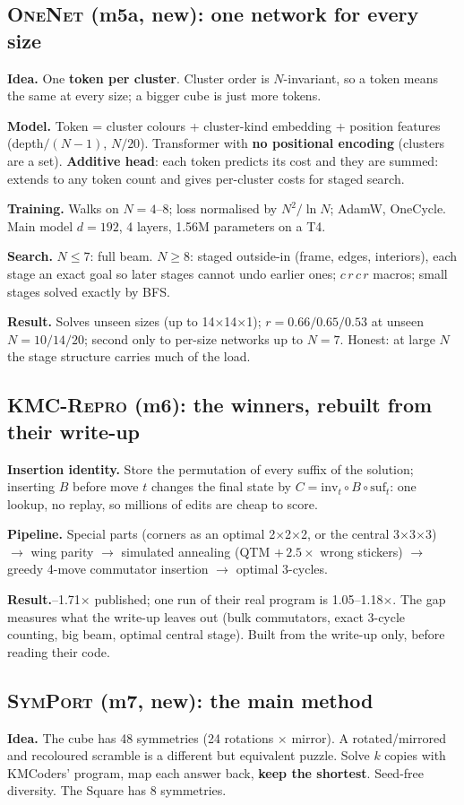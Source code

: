 \documentclass[10.5pt,a4paper]{article}
\newcommand{\Cu}[1]{#1$\times$#1$\times$#1}
\newcommand{\Sq}[1]{#1$\times$#1$\times$1}
\newcommand{\M}[1]{\textsc{#1}}
\newcommand{\sub}[1]{\par\smallskip\textbf{#1}\quad}
\begin{document}
\subsection{\M{OneNet} (m5a, new): one network for every size}
\sub{Idea.} One \textbf{token per cluster}. Cluster order is $N$-invariant, so a token means the same at every size; a bigger
cube is just more tokens.
\sub{Model.} Token = cluster colours + cluster-kind embedding + position features (depth$/(N-1)$, $N/20$). Transformer with
\textbf{no positional encoding} (clusters are a set). \textbf{Additive head}: each token predicts its cost and they are summed:
extends to any token count and gives per-cluster costs for staged search.
\sub{Training.} Walks on $N=4$--8; loss normalised by $N^2/\ln N$; AdamW, OneCycle. Main model $d=192$, 4 layers, 1.56M
parameters on a T4.
\sub{Search.} $N\le7$: full beam. $N\ge8$: staged outside-in (frame, edges, interiors), each stage an exact goal so later stages
cannot undo earlier ones; $c\,r\,c\,r$ macros; small stages solved exactly by BFS.
\sub{Result.} Solves unseen sizes (up to \Sq{14}); $r=0.66/0.65/0.53$ at unseen $N=10/14/20$; second only to per-size networks
up to $N=7$. Honest: at large $N$ the stage structure carries much of the load.

\subsection{\M{KMC-Repro} (m6): the winners, rebuilt from their write-up}
\sub{Insertion identity.} Store the permutation of every suffix of the solution; inserting $B$ before move $t$ changes the final
state by $C=\mathrm{inv}_t\circ B\circ\mathrm{suf}_t$: one lookup, no replay, so millions of edits are cheap to score.
\sub{Pipeline.} Special parts (corners as an optimal \Cu{2}, or the central \Cu{3}) $\to$ wing parity $\to$ simulated annealing
(QTM $+\,2.5\times$ wrong stickers) $\to$ greedy 4-move commutator insertion $\to$ optimal 3-cycles.
\sub{Result.} 1.61--1.71$\times$ published; one run of their real program is 1.05--1.18$\times$. The gap measures what the write-up
leaves out (bulk commutators, exact 3-cycle counting, big beam, optimal central stage). Built from the write-up only, before
reading their code.

\subsection{\M{SymPort} (m7, new): the main method}
\sub{Idea.} The cube has 48 symmetries (24 rotations $\times$ mirror). A rotated/mirrored and recoloured scramble is a different
but equivalent puzzle. Solve $k$ copies with KMCoders' program, map each answer back, \textbf{keep the shortest}. Seed-free
diversity. The Square has 8 symmetries.
\end{document}
